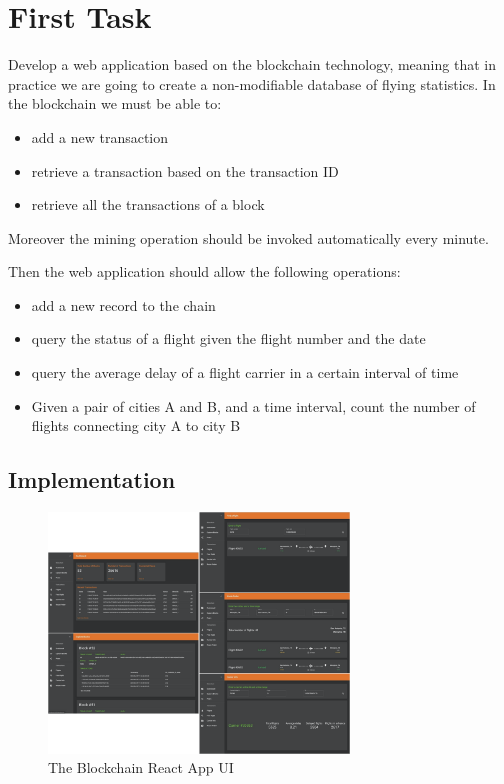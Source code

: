 \documentclass[11pt]{scrartcl} %
\begin{document}
\section{First Task}

Develop a web application based on the blockchain technology, meaning that in practice we are going to create a non-modifiable database of flying statistics. In the blockchain we must be able to:
\begin{itemize}
\item[\adforn{43}] add a new transaction
\item[\adforn{43}] retrieve a transaction based on the transaction ID
\item[\adforn{43}] retrieve all the transactions of a block
\end{itemize}

Moreover the mining operation should be invoked automatically every minute. 

Then the web application should allow the following operations:
\begin{itemize}
\item[\adforn{43}] add a new record to the chain
\item[\adforn{43}] query the status of a flight given the flight number and the date
\item[\adforn{43}] query the average delay of a flight carrier in a certain interval of time
\item[\adforn{43}] Given a pair of cities A and B, and a time interval, count the number of flights connecting city A to city B
\end{itemize}

\subsection{Implementation}

\begin{figure}[h]
\includegraphics[width=8cm]{Images/frontend.png}
\centering
\caption{The Blockchain React App UI}
\label{fig:frontend}
\end{figure}
\end{document}
